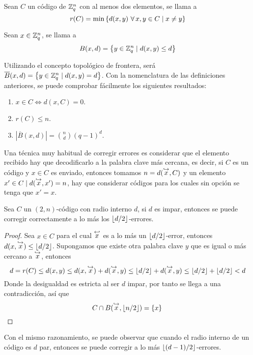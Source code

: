 \begin{definition}
	Sean $C$ un código de $\mathbb{Z}_q^n$ con al menos dos elementos, se llama  a
	\[
		r(C) = \min\set{d(x,y)\ \forall x,y\in C\tq x\neq y}
	\]
\end{definition}

\begin{definition}
	Sean $x\in\mathbb{Z}_q^n$, se llama  a
	\[
		B(x, d) = \left\{y\in\mathbb{Z}_q^n \mid d(x,y)\leq d\right\}
	\]
\end{definition}

Utilizando el concepto topológico de frontera, será $\overline{B}(x, d) = \left\{y\in\mathbb{Z}_q^n \mid d(x,y)= d\right\}$.
Con la nomenclatura de las definiciones anteriores, se puede comprobar fácilmente los siguientes resultados:
\begin{enumerate}
	\item $x\in C \iff d(x, C) = 0$.
	\item $r(C) \leq n$.
	\item $|\overline{B}(x, d)| = \binom{n}{d}(q-1)^d$.
\end{enumerate}

Una técnica muy habitual de corregir errores es considerar que el elemento recibido hay que decodificarlo a la palabra clave más cercana, es decir, si $C$ es un código y $x\in C$ es enviado, entonces tomamos $n=d(\stackrel{\hookrightarrow}{x}, C)$ y un elemento $x'\in C\mid d(\stackrel{\hookrightarrow}{x}, x')=n$, hay que considerar códigos para los cuales sin opción se tenga que $x'=x$.

\begin{lemma}
	Sea $C$ un $(2, n)$-código con radio interno $d$, si $d$ es impar, entonces se puede corregir correctamente a lo más los $\lfloor d/2 \rfloor$-errores.
\end{lemma}
\begin{proof}
	Sea $x\in C$ para el cual $\stackrel{\hookleftarrow}{x}$ es a lo más un $\lfloor d/2 \rfloor$-error, entonces $d(x, \stackrel{\hookrightarrow}{x})\leq\lfloor d/2 \rfloor$.
	Supongamos que existe otra palabra clave $y$ que es igual o más cercano a $\stackrel{\hookrightarrow}{x}$, entonces
	\[
		d = r(C) \leq d(x, y) \leq d(x, \stackrel{\hookrightarrow}{x}) + d(\stackrel{\hookrightarrow}{x}, y) \leq \lfloor d/2 \rfloor + d(\stackrel{\hookrightarrow}{x}, y) \leq \lfloor d/2 \rfloor + \lfloor d/2 \rfloor < d
	\]
	Donde la desigualdad es estricta al ser $d$ impar, por tanto se llega a una contradicción, así que
	\[
		C\cap B(\stackrel{\hookrightarrow}{x}, \lfloor n/2 \rfloor) = \left\{x\right\}\qedhere
	\]
\end{proof}

Con el mismo razonamiento, se puede observar que cuando el radio interno de un código es $d$ par, entonces se puede corregir a lo más $\lfloor (d-1)/2 \rfloor$-errores.

